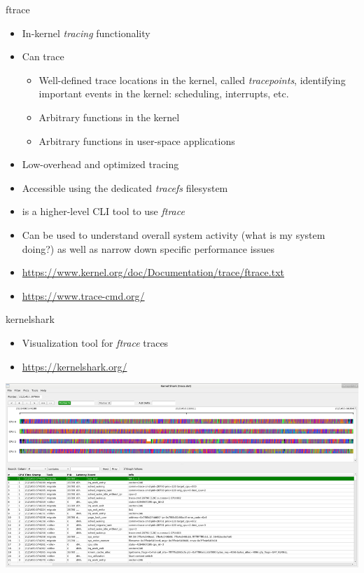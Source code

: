 \begin{frame}{ftrace}
  \begin{itemize}
  \item In-kernel {\em tracing} functionality
  \item Can trace
    \begin{itemize}
    \item Well-defined trace locations in the kernel, called {\em
        tracepoints}, identifying important events in the kernel:
      scheduling, interrupts, etc.
    \item Arbitrary functions in the kernel
    \item Arbitrary functions in user-space applications
    \end{itemize}
  \item Low-overhead and optimized tracing
  \item Accessible using the dedicated {\em tracefs} filesystem
  \item {} is a higher-level CLI tool to use {\em
      ftrace}
  \item Can be used to understand overall system activity (what is my
    system doing?) as well as narrow down specific performance
    issues
  \item \url{https://www.kernel.org/doc/Documentation/trace/ftrace.txt}
  \item \url{https://www.trace-cmd.org/}
  \end{itemize}
\end{frame}

\begin{frame}{kernelshark}
  \begin{itemize}
  \item Visualization tool for {\em ftrace} traces
  \item \url{https://kernelshark.org/}
  \end{itemize}
  \begin{center}
    \includegraphics[height=0.6\textheight]{slides/sysdev-application-development/kernelshark.png}
  \end{center}
\end{frame}

